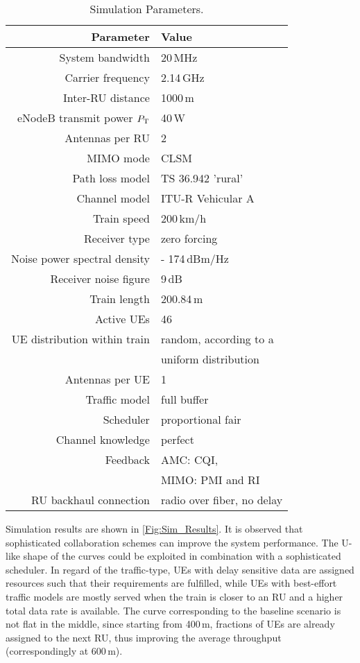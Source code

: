 \documentclass[a4paper,conference,twocolumn,10pt]{IEEEtran}
\begin{document}
\begin{table}
	\centering        
	\caption{Simulation Parameters.}\label{Tab:Simulationparameters}  
	\begin{tabular}{r|l}
		\toprule
		\textbf{Parameter} & \textbf{Value} \\
		\hline
		System bandwidth & 20\,MHz \\
		Carrier frequency & 2.14\,GHz \\
		Inter-\ac{RU} distance & 1000\,m \\
		eNodeB transmit power $P_{\rm T}$ & 40\,W\\
		Antennas per \ac{RU} & 2 \\
		MIMO mode & CLSM \\
		Path loss model & TS 36.942 'rural'  \cite{3gppTS36942}\\
		Channel model &  ITU-R Vehicular A \cite{ItuRVehA} \\
		Train speed & 200\,km/h\\
		Receiver type & zero forcing \\
		Noise power spectral density & - 174\,dBm/Hz \\
		Receiver noise figure & 9\,dB \\
		Train length & 200.84\,m \\
		Active \acp{UE} & 46 \\
		\ac{UE} distribution within train & random, according to a\\
		& uniform distribution \\ 
		Antennas per \ac{UE} & 1 \\
		Traffic model & full buffer \\
		Scheduler & proportional fair \\
		Channel knowledge & perfect \\
		Feedback & AMC: CQI, \\
		&  MIMO: PMI and RI \\
		\ac{RU} backhaul connection & radio over fiber, no delay \\
		\bottomrule
	\end{tabular} 
\end{table}

Simulation results are shown in \cref{Fig:Sim_Results}. It is observed that sophisticated collaboration schemes can improve the system performance. The U-like shape of the curves could be exploited in combination with a sophisticated scheduler. In regard of the traffic-type, \acp{UE} with delay sensitive data are assigned resources such that their requirements are fulfilled, while \acp{UE} with best-effort traffic models are mostly served when the train is closer to an \ac{RU} and a higher total data rate is available. The curve corresponding to the baseline scenario is not flat in the middle, since starting from 400\,m, fractions of \acp{UE} are already assigned to the next \ac{RU}, thus improving the average throughput (correspondingly at 600\,m).\\
\end{document}
